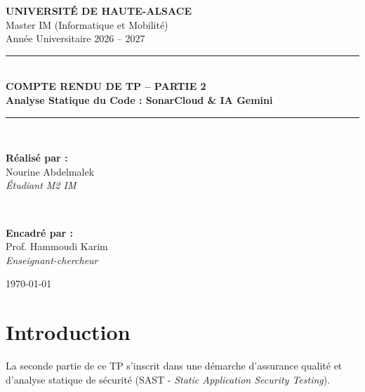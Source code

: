 \documentclass[12pt,a4paper]{article}
\begin{document}
\begin{titlepage}
    \centering
    \vspace*{1cm}
    
    {\Large \textbf{UNIVERSITÉ DE HAUTE-ALSACE}}\\[0.3cm]
    {\large Master IM (Informatique et Mobilité)}\\[0.2cm]
    {\large Année Universitaire 2026 -- 2027}\\[2.5cm]
    
    \rule{\linewidth}{0.5mm}\\[0.5cm]
    {\huge \bfseries COMPTE RENDU DE TP -- PARTIE 2}\\[0.3cm]
    {\Large \textbf{Analyse Statique du Code : SonarCloud \& IA Gemini}}\\[0.5cm]
    \rule{\linewidth}{0.5mm}\\[3cm]
    
    \begin{minipage}{0.45\textwidth}
        \begin{flushleft} \large
            \textbf{Réalisé par :}\\
            Nourine Abdelmalek\\
            \textit{Étudiant M2 IM}
        \end{flushleft}
    \end{minipage}
    ~
    \begin{minipage}{0.45\textwidth}
        \begin{flushright} \large
            \textbf{Encadré par :}\\
            Prof. Hammoudi Karim\\
            \textit{Enseignant-chercheur}
        \end{flushright}
    \end{minipage}
    
    \vfill
    
    {\large \today}
\end{titlepage}

\newpage
\tableofcontents
\newpage

\section{Introduction}
La seconde partie de ce TP s'inscrit dans une démarche d'assurance qualité et d'analyse statique de sécurité (SAST - \textit{Static Application Security Testing}). 
\end{document}
